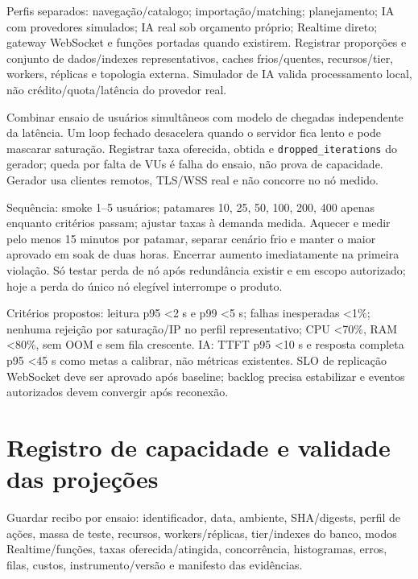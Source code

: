 \documentclass[10pt,a4paper]{article}
\begin{document}
Perfis separados: navegação/catalogo; importação/matching; planejamento;
IA com provedores simulados; IA real sob orçamento próprio; Realtime
direto; gateway WebSocket e funções portadas quando existirem. Registrar
proporções e conjunto de dados/indexes representativos, caches
frios/quentes, recursos/tier, workers, réplicas e topologia externa.
Simulador de IA valida processamento local, não crédito/quota/latência
do provedor real.

Combinar ensaio de usuários simultâneos com modelo de chegadas
independente da latência. Um loop fechado desacelera quando o servidor
fica lento e pode mascarar saturação. Registrar taxa oferecida, obtida e
{\footnotesize\ttfamily\nolinkurl{dropped_iterations}} do gerador; queda por falta de VUs é falha
do ensaio, não prova de capacidade. Gerador usa clientes remotos,
TLS/WSS real e não concorre no nó medido.

Sequência: smoke 1--5 usuários; patamares 10, 25, 50, 100, 200, 400
apenas enquanto critérios passam; ajustar taxas à demanda medida.
Aquecer e medir pelo menos 15 minutos por patamar, separar cenário frio
e manter o maior aprovado em soak de duas horas. Encerrar aumento
imediatamente na primeira violação. Só testar perda de nó após
redundância existir e em escopo autorizado; hoje a perda do único nó
elegível interrompe o produto.

Critérios propostos: leitura p95 \textless2 s e p99 \textless5 s; falhas
inesperadas \textless1\%; nenhuma rejeição por saturação/IP no perfil
representativo; CPU \textless70\%, RAM \textless80\%, sem OOM e sem fila
crescente. IA: TTFT p95 \textless10 s e resposta completa p95
\textless45 s como metas a calibrar, não métricas existentes. SLO de
replicação WebSocket deve ser aprovado após baseline; backlog precisa
estabilizar e eventos autorizados devem convergir após reconexão.

\clearpage
\section{Registro de capacidade e validade das
projeções}\label{registro-de-capacidade-e-validade-das-projeuxe7uxf5es}

Guardar recibo por ensaio: identificador, data, ambiente, SHA/digests,
perfil de ações, massa de teste, recursos, workers/réplicas,
tier/indexes do banco, modos Realtime/funções, taxas oferecida/atingida,
concorrência, histogramas, erros, filas, custos, instrumento/versão e
manifesto das evidências.
\end{document}
